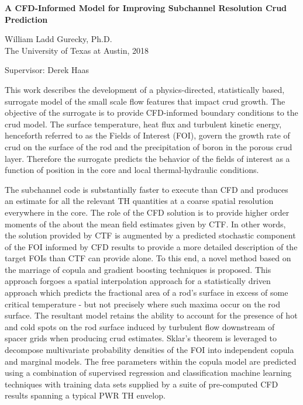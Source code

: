 
\begin{center}
	\large{
		\bf{A CFD-Informed Model for Improving Subchannel Resolution Crud Prediction}
	}
	\vspace{1cm}
	
	\small{	

	William Ladd Gurecky, Ph.D. \\
	The University of Texas at Austin, 2018
   
    \vspace{1cm} 
   	Supervisor:  Derek Haas
    }
\end{center}
\vspace{1cm}

\small{
This work describes the development of a physics-directed, statistically based,
surrogate model of the small scale flow features that impact crud growth. The objective of the surrogate
is to provide CFD-informed boundary conditions to the crud model. The surface temperature, heat
flux and turbulent kinetic energy, henceforth referred to as the Fields of Interest (FOI),
govern the growth rate of crud on the surface of the rod and the
precipitation of boron in the porous crud layer. Therefore the surrogate predicts the behavior of the
fields of interest as a function of position in the core and local thermal-hydraulic conditions.

The subchannel code is substantially faster to execute than CFD
and produces an estimate for all the relevant TH quantities at a coarse spatial resolution everywhere in
the core. The role of the CFD solution is to provide higher order moments of the about the mean field estimates
given by CTF. In other words, the solution provided by CTF is augmented by a predicted stochastic
component of the FOI informed by CFD results to provide a more detailed description of the target
FOIs than CTF can provide alone. To this end, a novel method based on the marriage of copula and
gradient boosting techniques is proposed. This approach forgoes a spatial interpolation approach
for a statistically driven approach which predicts the fractional area of a rod’s surface in excess of some
critical temperature - but not precisely where such maxima occur on the rod surface.
The resultant model retains the ability to account for the presence
of hot and cold spots on the rod surface induced by turbulent flow downstream of spacer grids when
producing crud estimates. Sklar’s theorem is leveraged to decompose multivariate probability densities
of the FOI into independent copula and marginal models. The free parameters within the copula model
are predicted using a combination of supervised regression and classification machine learning techniques
with training data sets supplied by a suite of pre-computed CFD results spanning a typical PWR TH
envelop.
}
